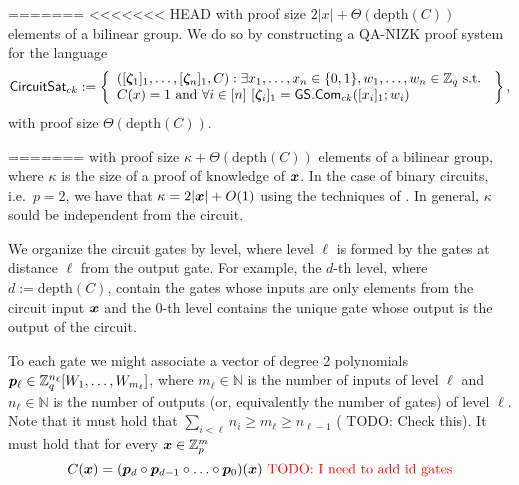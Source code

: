 =======
<<<<<<< HEAD
with proof size $2|x|+\Theta(\mathrm{depth}(C))$ elements of a bilinear group. We do so by constructing a QA-NIZK proof system for the language
\[
\mathsf{CircuitSat}_{ck}:=\left\{\begin{array}{l}
([\grkb{\zeta}_1]_1,\ldots,[\grkb{\zeta}_n]_1,C):\exists x_1,\ldots,x_n\in\bits,w_1,\ldots,w_n\in\Z_q \text{ s.t. } \\
C(x)=1 \text{ and } \forall i\in [n]\ [\grkb{\zeta}_i]_1=\GS.\Com_{ck}([x_i]_1;w_i)
\end{array}\right\},
\]
with proof size $\Theta(\mathrm{depth}(C))$.

=======
with proof size $\kappa+\Theta(\mathrm{depth}(C))$ elements of a bilinear group, where $\kappa$ is the size of a proof of knowledge of ${\boldsymbol{x}}$. In the case of binary circuits, i.e.~$p=2$, we have that $\kappa=2|{\boldsymbol{x}}|+O(1)$ using the techniques of \cite{AC:GonHevRaf15}. In general, $\kappa$ sould be independent from the circuit.


We organize the circuit gates by level, where level $\ell$ is formed by the gates at distance $\ell$ from the output gate. For example, the $d$-th level, where $d:=\mathrm{depth}({C})$, contain the gates whose inputs are only elements from the circuit input ${\boldsymbol{x}}$ and the $0$-th level contains the unique gate whose output is the output of the circuit.

To each gate we might associate a vector of degree 2 polynomials ${\boldsymbol{p}}_\ell \in \mathbb{Z}_q^{n_\ell}[W_1,\ldots,W_{m_\ell}]$, where $m_\ell\in\mathbb{N}$ is the number of inputs of level $\ell$ and $n_\ell\in\mathbb{N}$ is the number of outputs (or, equivalently the number of gates) of level $\ell$. Note that it must hold that $\sum_{i<\ell} n_i\geq m_\ell \geq n_{\ell-1}$ ({\color{red} TODO: Check this}). It must hold that for every ${\boldsymbol{x}}\in\mathbb{Z}_p^m$
$$
C({\boldsymbol{x}}) = ({\boldsymbol{p}}_{d}\circ{\boldsymbol{p}}_{d-1}\circ\ldots\circ {\boldsymbol{p}}_0) ({\boldsymbol{x}}) \text{  \color{red} TODO: I need to add id gates}
$$

